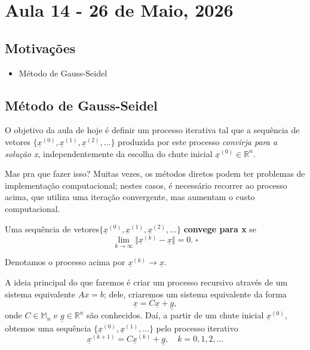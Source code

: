 \documentclass[../numerical_methods.tex]{subfiles}
\begin{document}
\section{Aula 14 - 26 de Maio, 2026}
\subsection{Motivações}
\begin{itemize}
	\item Método de Gauss-Seidel
\end{itemize}
\subsection{Método de Gauss-Seidel}
O objetivo da aula de hoje é definir um processo iterativa tal que a sequência de vetores \(\{\underline{x}^{(0)}, \underline{x}^{(1)}, \underline{x}^{(2)}, \dotsc \}\) produzida por este processo \textit{convirja para a solução x}, independentemente da escolha do chute inicial \(\underline{x}^{(0)}\in \mathbb{R}^{n}\).

Mas pra que fazer isso? Muitas vezes, os métodos diretos podem ter problemas de implementação computacional; nestes casos, é necessário recorrer ao processo acima, que utiliza uma iteração convergente, mas aumentam o custo computacional.
\begin{def*}
	Uma sequência de vetores\(\{\underline{x}^{(0)}, \underline{x}^{(1)}, \underline{x}^{(2)}, \dotsc \}\) \textbf{convege para x} se
	\[
		\lim_{k\to \infty}\Vert \underline{x}^{(k)}-\underline{x} \Vert = 0. \; \square
	\]
\end{def*}
Denotamos o processo acima por \(\underline{x}^{(k)}\rightarrow \underline{x}.\)

A ideia principal do que faremos é criar um processo recursivo através de um sistema equivalente \(Ax = b\); dele, criaremos um sistema equivalente da forma
\[
	\underline{x} = C\underline{x} + \underline{g},
\]
onde \(C\in \mathbb{M}_{n}\) e \(\underline{g}\in \mathbb{R}^{n}\) são conhecidos. Daí, a partir de um chute inicial \(\underline{x}^{(0)}\), obtemos uma sequência \(\{\underline{x}^{(0)}, \underline{x}^{(1)}, \dotsc \}\) pelo processo iterativo
\[
	\boxed{\underline{x}^{(k+1)} = C \underline{x}^{(k)} + \underline{g}}, \quad k = 0, 1, 2, \dotsc
\]
\end{document}
